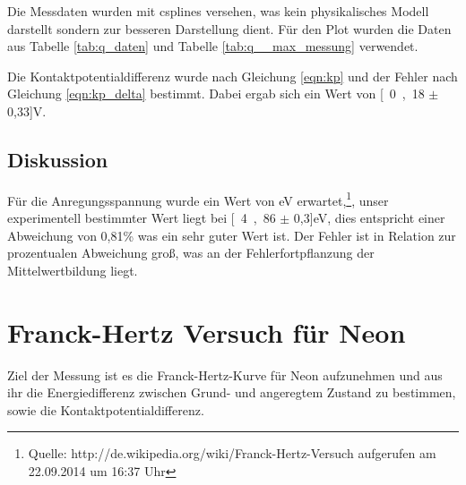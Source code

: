 \documentclass[12pt,a4paper]{article}
\begin{document}
Die Messdaten wurden mit csplines versehen, was kein physikalisches Modell darstellt sondern zur besseren Darstellung dient. Für den Plot wurden die Daten aus Tabelle \ref{tab:q_daten} und Tabelle \ref{tab:q__max_messung} verwendet.

Die Kontaktpotentialdifferenz wurde nach Gleichung \ref{eqn:kp} und
der Fehler nach Gleichung \ref{eqn:kp_delta}  bestimmt. Dabei ergab sich ein Wert von \unit[0,18 $\pm$ 0,33]{V}.

\subsection{Diskussion}

Für die Anregungsspannung wurde ein Wert von \unit[4,9]{eV} erwartet,\footnote{Quelle: http://de.wikipedia.org/wiki/Franck-Hertz-Versuch aufgerufen am 22.09.2014 um 16:37 Uhr}, unser experimentell bestimmter Wert liegt bei \unit[4,86 $\pm$ 0,3]{eV}, dies entspricht einer Abweichung von 0,81\% was ein sehr guter Wert ist. Der Fehler ist in Relation zur prozentualen Abweichung groß, was an der Fehlerfortpflanzung der Mittelwertbildung liegt.

\section{Franck-Hertz Versuch für Neon}
Ziel der Messung ist es die Franck-Hertz-Kurve für Neon aufzunehmen und aus ihr die Energiedifferenz zwischen Grund- und angeregtem Zustand zu bestimmen, sowie die Kontaktpotentialdifferenz.
\end{document}
